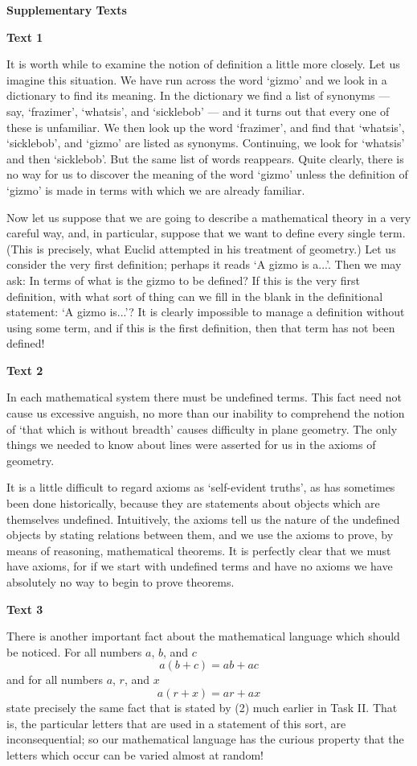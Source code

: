 \documentclass[a4paper]{article}
\newcommand{\ESect}[1]{\medskip\par{\large \textbf{#1}}\par}
\begin{document}
\ESect{Supplementary Texts}
\ESect{Text 1}
It is worth while to examine the notion of definition a little more closely. Let us imagine this situation. We have run across
the word `gizmo' and we look in a dictionary to find its meaning. In the dictionary we find a list of synonyms --- say, `frazimer',
`whatsis', and `sicklebob' --- and it turns out that every one of these is unfamiliar. We then look up the word `frazimer', and
find that `whatsis', `sicklebob', and `gizmo' are listed as synonyms. Continuing, we look for `whatsis' and then `sicklebob'. But
the same list of words reappears. Quite clearly, there is no way for us to discover the meaning of the word `gizmo' unless the
definition of `gizmo' is made in terms with which we are already familiar.

Now let us suppose that we are going to describe a mathematical theory in a very careful way, and, in particular, suppose
that we want to define every single term. (This is precisely, what Euclid attempted in his treatment of geometry.) Let us
consider the very first definition; perhaps it reads `A gizmo is a...'. Then we may ask: In terms of what is the
gizmo to be defined? If this is the very first definition, with what sort of thing can we fill in the blank in the
definitional statement: `A gizmo is...'? It is clearly impossible to manage a definition without using some term, and if
this is the first definition, then that term has not been defined!

\ESect{Text 2}
In each mathematical system there must be undefined terms. This fact need not cause us excessive anguish, no more than our
inability to comprehend the notion of `that which is without breadth' causes difficulty in plane geometry. The only things
we needed to know about lines were asserted for us in the axioms of geometry.

It is a little difficult to regard axioms as `self-evident truths', as has sometimes been done historically, because they
are statements about objects which are themselves undefined. Intuitively, the axioms tell us the nature of the undefined
objects by stating relations between them, and we use the axioms to prove, by means of reasoning, mathematical theorems.
It is perfectly clear that we must have axioms, for if we start with undefined terms and have no axioms we have absolutely
no way to begin to prove theorems.

\ESect{Text 3}
There is another important fact about the mathematical language which should be noticed. For all numbers $a$, $b$, and $c$
$$a(b+c)=ab+ac$$
and for all numbers $a$, $r$, and $x$
$$a(r+x)=ar+ax$$
state precisely the same fact that is stated by (2) much earlier in Task II. That is, the particular letters that are used in
a statement of this sort, are inconsequential; so our mathematical language has the curious property that the letters which
occur can be varied almost at random!
\end{document}
